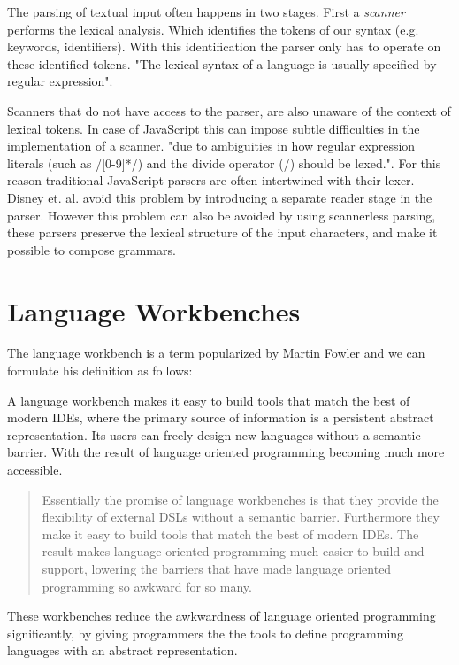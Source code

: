 The parsing of textual input often happens in two stages. First a \textit{scanner} performs the lexical analysis. Which identifies the tokens of our syntax (e.g. keywords, identifiers). With this identification the parser only has to operate on these identified tokens. "The lexical syntax of a language is usually specified by regular expression"\cite{Bravenboer2004}.

Scanners that do not have access to the parser, are also unaware of the context of lexical tokens. In case of JavaScript this can impose subtle difficulties in the implementation of a scanner. "due to ambiguities in how regular expression literals (such as /[0-9]*/) and the divide operator (/) should be lexed."\cite{Disney2014}. For this reason traditional JavaScript parsers are often intertwined with their lexer. Disney et. al. avoid this problem by introducing a separate reader stage in the parser. However this problem can also be avoided by using scannerless parsing, these parsers preserve the lexical structure of the input characters, and make it possible to compose grammars\cite{Visser1997}.  

\section{Language Workbenches} \label{rascal}

The language workbench is a term popularized by Martin Fowler and we can formulate his definition as follows:

A language workbench makes it easy to build tools that match the best of modern IDEs, where the primary source of information is a persistent abstract representation. Its users can freely design new languages without a semantic barrier. With the result of language oriented programming becoming much more accessible.\cite{Fowler2005}

\blockquote[\cite{Fowler2005}]{Essentially the promise of language workbenches is that they provide the flexibility of external DSLs without a semantic barrier. Furthermore they make it easy to build tools that match the best of modern IDEs. The result makes language oriented programming much easier to build and support, lowering the barriers that have made language oriented programming so awkward for so many.}

These workbenches reduce the awkwardness of language oriented programming\cite{Ward1994} significantly, by giving programmers the the tools to define programming languages with an abstract representation.

